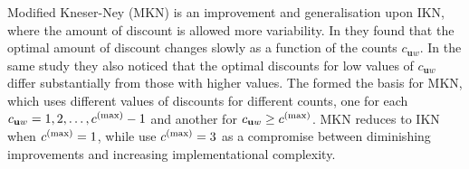 Modified Kneser-Ney (MKN) is an improvement and generalisation upon IKN, where the amount of discount is allowed more variability. In \cite{} they found that the optimal amount of discount changes slowly as a function of the counts $c_{\mathbf{u}w}$. In the same study they also noticed that the optimal discounts for low values of $c_{\mathbf{u}w}$ differ substantially from those with higher values. The formed the basis for MKN, which uses different values of discounts for different counts, one for each $c_{\mathbf{u}w} = 1, 2, \ldots, c^{(\textnormal{max})}-1$ and another for $c_{\mathbf{u}w} \geq c^{(\textnormal{max})}$. MKN reduces to IKN when $c^{(\textnormal{max})} = 1$, while \cite{} use $c^{(\textnormal{max})} = 3$ as a compromise between diminishing improvements and increasing implementational complexity.

